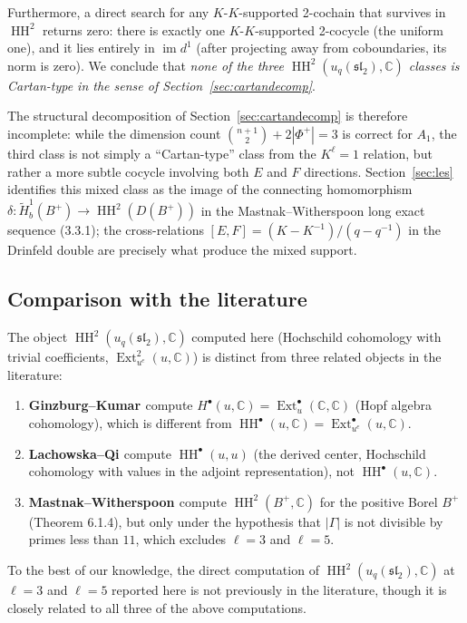 \documentclass[11pt,letterpaper]{amsart}
\theoremstyle{plain}
\theoremstyle{definition}
\theoremstyle{remark}
\newcommand{\HH}{\operatorname{HH}}
\newcommand{\Ext}{\operatorname{Ext}}
\newcommand{\CC}{\mathbb{C}}
\begin{document}
Furthermore, a direct search for any $K$-$K$-supported 2-cochain that survives in $\HH^2$ returns zero: there is exactly one $K$-$K$-supported 2-cocycle (the uniform one), and it lies entirely in $\operatorname{im} d^1$ (after projecting away from coboundaries, its norm is zero). We conclude that \emph{none of the three $\HH^2(u_q(\mathfrak{sl}_2), \CC)$ classes is Cartan-type in the sense of Section~\ref{sec:cartandecomp}}.

The structural decomposition of Section~\ref{sec:cartandecomp} is therefore incomplete: while the dimension count $\binom{n+1}{2} + 2|\Phi^+| = 3$ is correct for $A_1$, the third class is not simply a ``Cartan-type'' class from the $K^\ell = 1$ relation, but rather a more subtle cocycle involving both $E$ and $F$ directions. Section~\ref{sec:les} identifies this mixed class as the image of the connecting homomorphism $\delta: \tilde{H}^1_b(B^+) \to \HH^2(D(B^+))$ in the Mastnak--Witherspoon long exact sequence (3.3.1); the cross-relations $[E, F] = (K - K^{-1})/(q - q^{-1})$ in the Drinfeld double are precisely what produce the mixed support.

\subsection{Comparison with the literature}

The object $\HH^2(u_q(\mathfrak{sl}_2), \CC)$ computed here (Hochschild cohomology with trivial coefficients, $\Ext^2_{u^e}(u, \CC)$) is distinct from three related objects in the literature:
\begin{enumerate}
\item \textbf{Ginzburg--Kumar \cite{GK93}} compute $H^\bullet(u, \CC) = \Ext^\bullet_u(\CC, \CC)$ (Hopf algebra cohomology), which is different from $\HH^\bullet(u, \CC) = \Ext^\bullet_{u^e}(u, \CC)$.
\item \textbf{Lachowska--Qi \cite{LQ21}} compute $\HH^\bullet(u, u)$ (the derived center, Hochschild cohomology with values in the adjoint representation), not $\HH^\bullet(u, \CC)$.
\item \textbf{Mastnak--Witherspoon \cite{MW08}} compute $\HH^2(B^+, \CC)$ for the positive Borel $B^+$ (Theorem 6.1.4), but only under the hypothesis that $|\Gamma|$ is not divisible by primes less than $11$, which excludes $\ell = 3$ and $\ell = 5$.
\end{enumerate}
To the best of our knowledge, the direct computation of $\HH^2(u_q(\mathfrak{sl}_2), \CC)$ at $\ell = 3$ and $\ell = 5$ reported here is not previously in the literature, though it is closely related to all three of the above computations.
\end{document}
